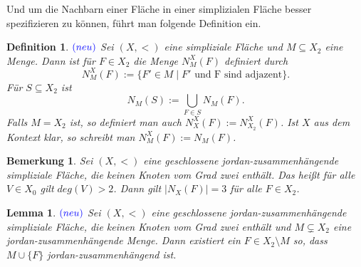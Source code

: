 \documentclass[12pt,titlepage]{article}
\newtheorem{lemma}{Lemma}
\newtheorem{definition}{Definition}[section]
\newtheorem{bemerkung}{Bemerkung}[section]
\begin{document}
Und um die Nachbarn einer Fläche in einer simplizialen Fläche besser spezifizieren zu können, führt man folgende Definition ein.
\begin{definition} $\textcolor{blue}{(neu)}$ 
Sei $(X,<)$ eine simpliziale Fläche und $M \subseteq X_2$ eine Menge. Dann ist für $F \in X_2$ die Menge $N_M^X(F)$ definiert durch
\[
N_M^X(F):=\{ F' \in M \mid F'\text{ und F sind adjazent}\} .
\]
Für $S \subseteq X_2$ ist 
\[
N_M(S):=\bigcup_{F\in S}N_M(F).
\]
Falls $M=X_2$ ist, so definiert man auch $N_X^X(F):=N^X_{X_2}(F)$. Ist $X$ aus dem Kontext klar, so schreibt man $N_M^X(F):=N_M(F)$.
\end{definition}
\begin{bemerkung}
Sei $(X,<)$ eine geschlossene jordan-zusammenhängende simpliziale Fläche, die keinen Knoten vom Grad zwei enthält. Das heißt für alle $V\in X_0$ gilt $deg(V)>2$. Dann gilt $\vert N_X(F)\vert=3$ für alle $F\in X_2$.
\end{bemerkung}
\begin{lemma} \label{lemma1} $\textcolor{blue}{(neu)}$
Sei $(X,<)$  eine geschlossene jordan-zusammenhängende simpliziale Fläche, die keinen Knoten vom Grad zwei enthält und $M \subsetneq X_2$ eine jordan-zusammenhängende Menge. Dann existiert ein $F\in X_2\setminus M$ so, dass $M \cup \{F\}$ jordan-zusammenhängend ist.
\end{lemma}
\end{document}
